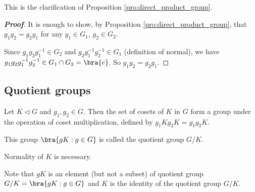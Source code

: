 \begin{remark}
This is the clarification of Proposition \ref{pro:direct_product_group}.
\end{remark}


\begin{proof}[\bf Proof]
It is enough to show, by Proposition \ref{pro:direct_product_group}, that $g_1g_2 = g_2 g_1$ for any $g_1 \in G_1$, $g_2 \in G_2$.

Since $g_1g_2g_1^{-1}\in G_2$ and $g_2g_1^{-1}g_2^{-1}\in G_1$ (definition of normal), we have $g_1g_2g_1^{-1}g_2^{-1} \in G_1\cap G_2 = \bra{e}$. So $g_1g_2 = g_2 g_1$.
\end{proof}



\subsection{Quotient groups}

\begin{theorem}\label{thm:quotient_group}
Let $K \lhd G$ and $g_1,g_2\in G$. Then the set of cosets of $K$ in $G$ form a group under the operation of coset multiplication, defined by $g_1Kg_2K = g_1g_2K$. 

This group $\bra{gK:g\in G}$ is called the quotient group $G/K$.%
\end{theorem}

\begin{remark}
Normality of $K$ is necessary.

Note that $gK$ is an element (but not a subset) of quotient group $G/K = \bra{gK:g\in G}$ and $K$ is the identity of the quotient group $G/K$.

\end{remark}

